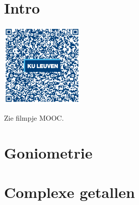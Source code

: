 
\section*{Intro}

\begin{minipage}{.25\linewidth}
	\raggedright
	\includegraphics[width=4cm]{3_gonio_complexe_getallen/inputs/QR_Code_INTRO_module3new}
\end{minipage}
\begin{minipage}{.7\linewidth}
	Zie filmpje MOOC.
\end{minipage}

\section{Goniometrie}



\pagebreak

\section{Complexe getallen}

